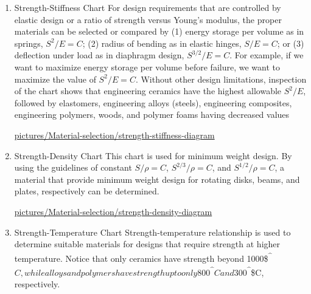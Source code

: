 \documentclass[a4paper,openany,12pt]{book}
\begin{document}
\begin{enumerate}
\item Strength-Stiffness Chart
\label{strength-stiffness-chart}
For design requirements that are controlled by elastic design or a ratio
of strength versus Young's modulus, the proper materials can be selected
or compared by (1) energy storage per volume as in springs, \(S^2/E = C\);
(2) radius of bending as in elastic hinges, \(S/E = C\); or (3) deflection
under load as in diaphragm design, \(S^{3/2}/E = C\). For example, if we
want to maximize energy storage per volume before failure, we want to
maximize the value of \(S^2/E = C\). Without other design limitations,
inspection of the chart shows that engineering ceramics have the highest
allowable \(S^2/E\), followed by elastomers, engineering alloys (steels),
engineering composites, engineering polymers, woods, and polymer foams
having decreased values


\cite{ashby2010materials}
\url{pictures/Material-selection/strength-stiffness-diagram}

\item Strength-Density Chart
\label{strength-density-chart}
This chart is used for minimum weight design. By using the guidelines of
constant \(S/\rho = C\), \(S^{2/3}/\rho = C\), and \(S^{1/2}/\rho = C\), a
material that provide minimum weight design for rotating disks, beams,
and plates, respectively can be determined.


\url{pictures/Material-selection/strength-density-diagram}

\item Strength-Temperature Chart
\label{strength-temperature-chart}
Strength-temperature relationship is used to determine suitable
materials for designs that require strength at higher temperature.
Notice that only ceramics have strength beyond 1000\$\textsuperscript{\^{}}\(C, while
alloys and polymers have strength up to only 800\)\textsuperscript{\^{}}\(C and
300\)\textsuperscript{\^{}}\$C, respectively.



\end{enumerate}
\end{document}

